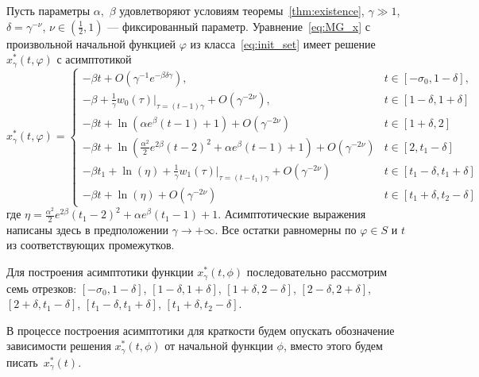 \begin{theorem}
\label{thm:th_asymp}
Пусть параметры $\alpha,$ $\beta$ удовлетворяют условиям теоремы~\ref{thm:existence}, $\gamma \gg 1$, $\delta = \gamma^{-\nu}$, $\nu \in (\frac{1}{2}, 1)$ --- фиксированный параметр. Уравнение~\eqref{eq:MG_x} с произвольной начальной функцией $\varphi$ из класса~\eqref{eq:init_set} имеет решение $x_\gamma^*(t, \varphi)$ с асимптотикой
\footnotesize
\begin{equation}
	\label{eq:sol_x*gamma}
	x^*_\gamma(t, \varphi)= 
	\begin{cases}
		- \beta t + O(\gamma^{-1} e^{-\beta \delta \gamma}), & t\in[-\sigma_0, 1 - \delta],\\
		-\beta + \frac{1}{\gamma} w_0(\tau)|_{\tau=(t - 1)\gamma} + O(\gamma^{-2\nu}), & t \in [1 - \delta,1 + \delta]\\
		- \beta t + \ln(\alpha e^{\beta}(t - 1) + 1) + O(\gamma^{-2\nu}) & t\in[1 + \delta, 2]\\
		- \beta t + \ln(\frac{\alpha^2}{2}e^{2 \beta}(t - 2)^2 + \alpha e^{\beta}(t - 1) + 1) + O(\gamma^{-2\nu}) & t \in [2, t_1 - \delta]\\
		- \beta t_1 + \ln(\eta)+\frac{1}{\gamma} w_1(\tau)|_{\tau=(t - t_1)\gamma} + O(\gamma^{-2\nu}) & t\in[t_1 - \delta, t_1  +\delta]\\
		- \beta t + \ln(\eta) + O(\gamma^{-2\nu}) & t \in [t_1 + \delta, t_2 - \delta]
	\end{cases}
\end{equation}
\normalsize
где $\eta=\frac{\alpha^2}{2}e^{2\beta}(t_1 - 2)^2 + \alpha e^{\beta}(t_1 - 1) + 1$.
Асимптотические выражения написаны здесь в предположении $\gamma\to+\infty$.
Все остатки равномерны по $\varphi \in S$ и $t$ из соответствующих промежутков.
\end{theorem}

Для построения асимптотики функции $x_\gamma^*(t, \phi)$ последовательно рассмотрим семь отрезков:
$[-\sigma_0, 1 - \delta]$, 
$[1  -\delta, 1 + \delta]$,
$[1 + \delta, 2 - \delta]$,
$[2 - \delta, 2 + \delta]$,
$[2 + \delta, t_1 - \delta]$,
$[t_1 - \delta, t_1 + \delta]$,
$[t_1 + \delta, t_2 - \delta]$.

В процессе построения асимптотики для краткости будем опускать обозначение зависимости решения $x_{\gamma}^*(t, \phi)$ от начальной функции $\phi$, вместо этого будем писать~$x_\gamma^*(t)$.

